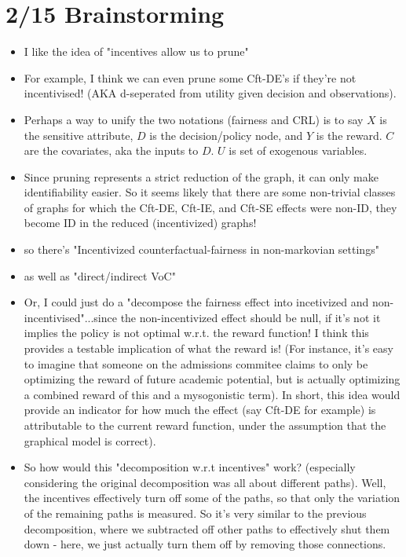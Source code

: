 \documentclass[letterpaper,10pt]{article}
\begin{document}
\section{2/15 Brainstorming}
\begin{itemize}
  \item I like the idea of "incentives allow us to prune"
  \item For example, I think we can even prune some Cft-DE's if they're not incentivised! (AKA d-seperated from utility given decision and observations).
  \item Perhaps a way to unify the two notations (fairness and CRL) is to say $X$ is the sensitive attribute, $D$ is the decision/policy node, and $Y$ is the reward. $C$ are the covariates, aka the inputs to $D$. $U$ is set of exogenous variables.
  \item Since pruning represents a strict reduction of the graph, it can only make identifiability easier. So it seems likely that there are some non-trivial classes of graphs for which the Cft-DE, Cft-IE, and Cft-SE effects were non-ID, they become ID in the reduced (incentivized) graphs!
  \item so there's "Incentivized counterfactual-fairness in non-markovian settings"
  \item as well as "direct/indirect VoC"
  \item Or, I could just do a "decompose the fairness effect into incetivized and non-incentivised"...since the non-incentivized effect should be null, if it's not it implies the policy is not optimal w.r.t. the reward function! I think this provides a testable implication of what the reward is! (For instance, it's easy to imagine that someone on the admissions commitee claims to only be optimizing the reward of future academic potential, but is actually optimizing a combined reward of this and a mysogonistic term). In short, this idea would provide an indicator for how much the effect (say Cft-DE for example) is attributable to the current reward function, under the assumption that the graphical model is correct).
  \item So how would this "decomposition w.r.t incentives" work? (especially considering the original decomposition was all about different paths). Well, the incentives effectively turn off some of the paths, so that only the variation of the remaining paths is measured. So it's very similar to the previous decomposition, where we subtracted off other paths to effectively shut them down - here, we just actually turn them off by removing those connections.

\end{itemize}
\end{document}
